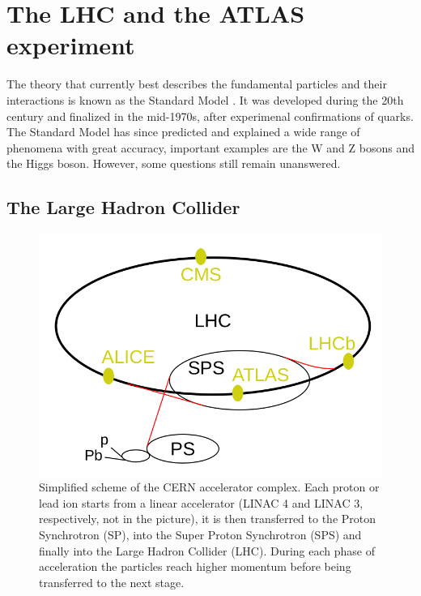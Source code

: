 
\chapter{The LHC and the ATLAS experiment}%

The theory that currently best describes the fundamental particles and their interactions is known as the Standard Model \cite{Herrero1999}. It was developed during the 20th century and finalized in the mid-1970s, after experimenal confirmations of quarks. The Standard Model has since predicted and explained a wide range of phenomena with great accuracy, important examples are the W and Z bosons and the Higgs boson. However, some questions still remain unanswered.


\section{The Large Hadron Collider}
\begin{figure}[!ht]
    \centering
    \includegraphics[width=.7\linewidth]{Images/intro/LHC.png}
    \captionsetup{width=.7\linewidth}
    \caption{Simplified scheme of the CERN accelerator complex. Each proton or lead ion starts from a linear accelerator (LINAC 4 and LINAC 3, respectively, not in the picture), it is then transferred to the Proton Synchrotron (SP), into the Super Proton Synchrotron (SPS) and finally into the Large Hadron Collider (LHC). During each phase of acceleration the particles reach higher momentum before being transferred to the next stage.}
    \label{fig:LHC}
\end{figure}


